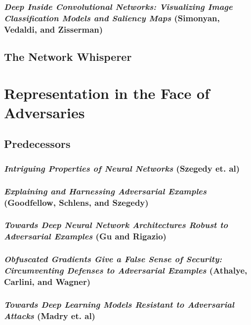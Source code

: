 \documentclass[showabstract,showacknowledgments,showpreface,showdedication]{iuphd}
\begin{document}
\subsection{\textit{Deep Inside Convolutional Networks: Visualizing Image Classification Models and Saliency Maps} (Simonyan, Vedaldi, and Zisserman)}


\section{The Network Whisperer}
\label{detectionasproofofrepresentation}




\chapter{Representation in the Face of Adversaries}

\section{Predecessors}

\subsection{\textit{Intriguing Properties of Neural Networks} (Szegedy et. al)}

\subsection{\textit{Explaining and Harnessing Adversarial Examples} (Goodfellow, Schlens, and Szegedy)}

\subsection{\textit{Towards Deep Neural Network Architectures Robust to Adversarial Examples} (Gu and Rigazio)}

\subsection{\textit{Obfuscated Gradients Give a False Sense of Security: Circumventing Defenses to Adversarial Examples} (Athalye, Carlini, and Wagner)}

\label{oggafsoscdtae}
\subsection{\textit{Towards Deep Learning Models Resistant to Adversarial Attacks} (Madry et. al)}
\label{tdlmrtaa}

\end{document}
